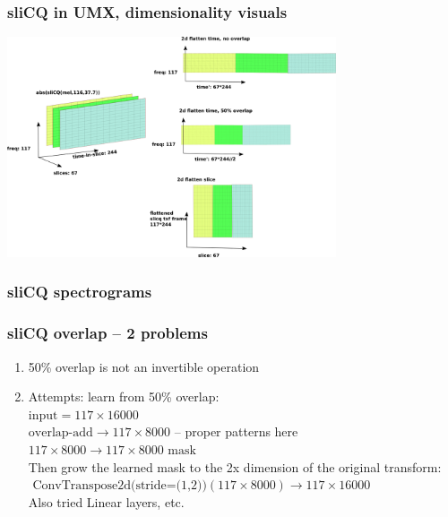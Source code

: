 \documentclass[usenames,dvipsnames]{beamer}
\begin{document}
\begin{frame}
	\frametitle{sliCQ in UMX, dimensionality visuals}
	\includegraphics[height=6.5cm]{./umxslicqdimred.png}
\end{frame}

\begin{frame}
	\frametitle{sliCQ spectrograms}
	\begin{figure}
	\end{figure}
\end{frame}

\begin{frame}
	\frametitle{sliCQ overlap -- 2 problems}
	\begin{enumerate}
		\item
			50\% overlap is not an invertible operation
		\item
			Attempts: learn from 50\% overlap:\\
			$\text{input} = 117 \times 16000$\\
			$\text{overlap-add} \rightarrow 117 \times 8000$ -- proper patterns here
			$117 \times 8000 \rightarrow 117 \times 8000 \text{ mask}$\\
			Then grow the learned mask to the 2x dimension of the original transform:\\
			$\text{ ConvTranspose2d(stride=(1,2))}(117 \times 8000) \rightarrow 117 \times 16000$\\
			Also tried Linear layers, etc.
	\end{enumerate}
\end{frame}
\end{document}
